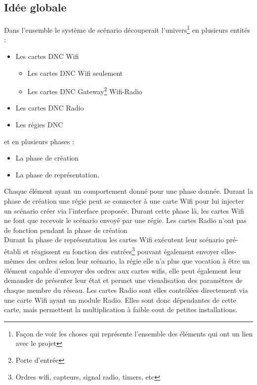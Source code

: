 \subsection{Idée globale}
Dans l'ensemble le système de scénario découperait l'univers\footnote{Façon de voir les choses qui représente l'ensemble des éléments qui ont un lien avec le projet} en plusieurs entités :
\begin{itemize}
\item Les cartes DNC Wifi
	\begin{itemize}
	\item Les cartes DNC Wifi seulement
	\item Les cartes DNC Gateway\footnote{Porte d'entrée} Wifi-Radio
	\end{itemize}
\item Les cartes DNC Radio
\item Les régies DNC
\end{itemize}
et en plusieurs phases :
\begin{itemize}
\item La phase de création
\item La phase de représentation.
\end{itemize}
Chaque élément ayant un comportement donné pour une phase donnée.\p
Durant la phase de création une régie peut se connecter à une carte Wifi pour lui injecter un scénario créer via l'interface proposée. Durant cette phase là, les cartes Wifi ne font que recevoir le scénario envoyé par une régie. Les cartes Radio n'ont pas de fonction pendant la phase de création\\
Durant la phase de représentation les cartes Wifi exécutent leur scénario pré-établi et réagissent en fonction des entrées\footnote{Ordres wifi, capteurs, signal radio, timers, etc} pouvant également envoyer elles-mêmes des ordres selon leur scénario, la régie elle n'a plus que vocation à être un élément capable d'envoyer des ordres aux cartes wifis, elle peut également leur demander de présenter leur état et permet une visualisation des paramètres de chaque membre du réseau. Les cartes Radio sont elles contrôlées directement via une carte Wifi ayant un module Radio. Elles sont donc dépendantes de cette carte, mais permettent la multiplication à faible cout de petites installations.

